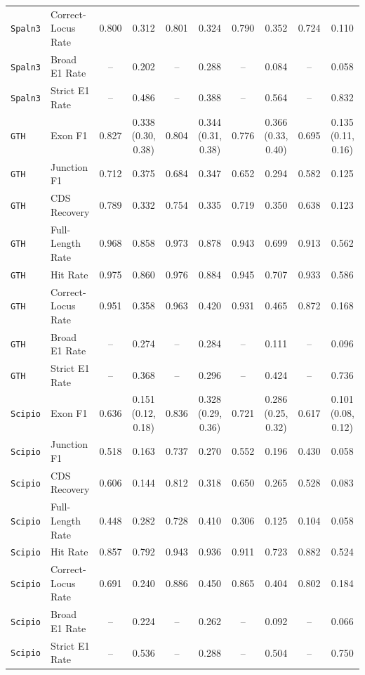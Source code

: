 \begin{table}[t]
\begin{tabular}{llcccccccc}
\texttt{Spaln3} & Correct-Locus Rate & 0.800 & 0.312 & 0.801 & 0.324 & 0.790 & 0.352 & 0.724 & 0.110 \\
\texttt{Spaln3} & Broad E1 Rate & -- & 0.202 & -- & 0.288 & -- & 0.084 & -- & 0.058 \\
\texttt{Spaln3} & Strict E1 Rate & -- & 0.486 & -- & 0.388 & -- & 0.564 & -- & 0.832 \\
\midrule
\texttt{GTH} & Exon F1 & 0.827 & 0.338 (0.30, 0.38) & 0.804 & 0.344 (0.31, 0.38) & 0.776 & 0.366 (0.33, 0.40) & 0.695 & 0.135 (0.11, 0.16) \\
\texttt{GTH} & Junction F1 & 0.712 & 0.375 & 0.684 & 0.347 & 0.652 & 0.294 & 0.582 & 0.125 \\
\texttt{GTH} & CDS Recovery & 0.789 & 0.332 & 0.754 & 0.335 & 0.719 & 0.350 & 0.638 & 0.123 \\
\texttt{GTH} & Full-Length Rate & 0.968 & 0.858 & 0.973 & 0.878 & 0.943 & 0.699 & 0.913 & 0.562 \\
\texttt{GTH} & Hit Rate & 0.975 & 0.860 & 0.976 & 0.884 & 0.945 & 0.707 & 0.933 & 0.586 \\
\texttt{GTH} & Correct-Locus Rate & 0.951 & 0.358 & 0.963 & 0.420 & 0.931 & 0.465 & 0.872 & 0.168 \\
\texttt{GTH} & Broad E1 Rate & -- & 0.274 & -- & 0.284 & -- & 0.111 & -- & 0.096 \\
\texttt{GTH} & Strict E1 Rate & -- & 0.368 & -- & 0.296 & -- & 0.424 & -- & 0.736 \\
\midrule
\texttt{Scipio} & Exon F1 & 0.636 & 0.151 (0.12, 0.18) & 0.836 & 0.328 (0.29, 0.36) & 0.721 & 0.286 (0.25, 0.32) & 0.617 & 0.101 (0.08, 0.12) \\
\texttt{Scipio} & Junction F1 & 0.518 & 0.163 & 0.737 & 0.270 & 0.552 & 0.196 & 0.430 & 0.058 \\
\texttt{Scipio} & CDS Recovery & 0.606 & 0.144 & 0.812 & 0.318 & 0.650 & 0.265 & 0.528 & 0.083 \\
\texttt{Scipio} & Full-Length Rate & 0.448 & 0.282 & 0.728 & 0.410 & 0.306 & 0.125 & 0.104 & 0.058 \\
\texttt{Scipio} & Hit Rate & 0.857 & 0.792 & 0.943 & 0.936 & 0.911 & 0.723 & 0.882 & 0.524 \\
\texttt{Scipio} & Correct-Locus Rate & 0.691 & 0.240 & 0.886 & 0.450 & 0.865 & 0.404 & 0.802 & 0.184 \\
\texttt{Scipio} & Broad E1 Rate & -- & 0.224 & -- & 0.262 & -- & 0.092 & -- & 0.066 \\
\texttt{Scipio} & Strict E1 Rate & -- & 0.536 & -- & 0.288 & -- & 0.504 & -- & 0.750 \\

\end{tabular}
\end{table}
